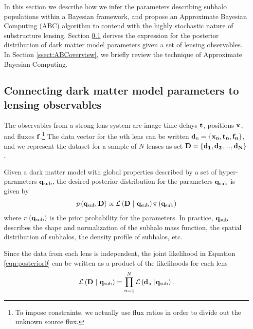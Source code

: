 In this section we describe how we infer the parameters describing subhalo populations within a Bayesian framework, and propose an Approximate Bayesian Computing (ABC) algorithm to contend with the highly stochastic nature of substructure lensing. Section \ref{ssect:overview} derives the expression for the posterior distribution of dark matter model parameters given a set of lensing observables. In Section \ref{ssect:ABCoverview}, we briefly review the technique of Approximate Bayesian Computing.

\subsection{Connecting dark matter model parameters to lensing observables}
\label{ssect:overview}

The observables from a strong lens system are image time delays $\bf{t}$, positions $\bf{x}$, and fluxes $\bf{f}$.\footnote{To impose constraints, we actually use flux ratios in order to divide out the unknown source flux.} The data vector for the $n$th lens can be written ${\bf{d}_{\rm{n}}} = \left\lbrace \bf{x}_n,\bf{t}_n,{\bf{f_n}}\right\rbrace$, and we represent the dataset for a sample of $N$ lenses as set ${\bf{D}} = \left\lbrace\bf{d}_1,\bf{d}_2,...,\bf{d}_N\right\rbrace$. 

Given a dark matter model with global properties described by a set of hyper-parameters ${\bf{q}_{\rm{sub}}}$, the desired posterior distribution for the parameters ${\bf{q}_{\rm{sub}}}$ is given by
\begin{equation}
\label{eqn:posterior0}
p\left(\qsub | \Data \right) \propto {\mathcal{L}}\left(\Data \ | \ \qsub \right) \pi\left(\qsub\right)
\end{equation}
where $\pi\left({\bf{q}_{\rm{sub}}}\right)$ is the prior probability for the parameters. In practice, ${\bf{q}_{\rm{sub}}}$ describes the shape and normalization of the subhalo mass function, the spatial distribution of subhalos, the density profile of subhalos, etc. 

Since the data from each lens is independent, the joint likelihood in Equation \ref{eqn:posterior0} can be written as a product of the likelihoods for each lens
\begin{equation}
\label{eqn:joint_like}
{\mathcal{L}}\left({\bf{D}} \ | \ {\bf{q}_{\rm{sub}}} \right) = \prod_{n=1}^{N} {\mathcal{L}} \left({\bf{d}_{\rm{n}}} \ | {\bf{q}_{\rm{sub}}}\right).
\end{equation}

